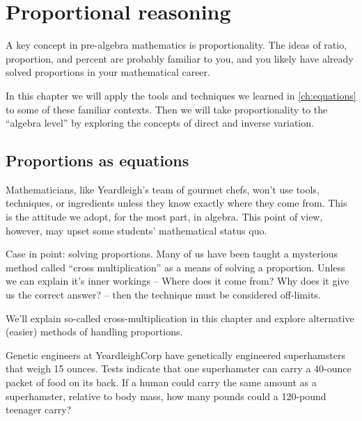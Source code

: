 \chapter{Proportional reasoning}
\label{ch:proportions}


A key concept in pre-algebra mathematics is proportionality. The ideas of ratio, proportion, and percent are probably familiar to you, and you likely have already solved proportions in your mathematical career.

In this chapter we will apply the tools and techniques we learned in \cref{ch:equations} to some of these familiar contexts. Then we will take proportionality to the ``algebra level'' by exploring the concepts of direct and inverse variation.

\section{Proportions as equations}
\label{sec:propsaseqs}

Mathematicians, like Yeardleigh's team of gourmet chefs, won't use tools, techniques, or ingredients unless they know exactly where they come from. This is the attitude we adopt, for the most part, in algebra. This point of view, however, may upset some students' mathematical status quo.

Case in point: solving proportions. Many of us have been taught a mysterious method called ``cross multiplication'' as a means of solving a proportion. Unless we can explain it's inner workings -- Where does it come from? Why does it give us the correct answer? -- then the technique must be considered off-limits.

We'll explain so-called cross-multiplication in this chapter and explore alternative (easier) methods of handling proportions.


\begin{boxexplore}
Genetic engineers at YeardleighCorp have genetically engineered superhamsters that weigh 15 ounces. Tests indicate that one superhamster can carry a 40-ounce packet of food on its back. If a human could carry the same amount as a superhamster, relative to body mass, how many pounds could a 120-pound teenager carry?
\end{boxexplore}

